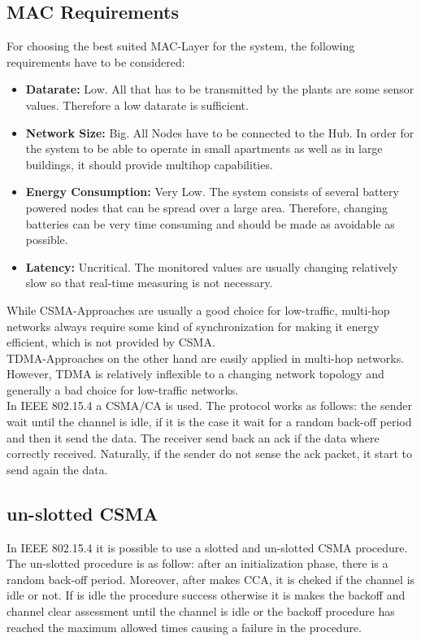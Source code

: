 \subsection{MAC Requirements}
For choosing the best suited MAC-Layer for the system, the following requirements have to be considered:

\begin{itemize}
	\item \textbf{Datarate:}
	Low. All that has to be transmitted by the plants are some sensor values. Therefore a low datarate is sufficient.
	\item \textbf{Network Size:}
	Big. All Nodes have to be connected to the Hub. In order for the system to be able to operate in small apartments as well as in large buildings, it should provide multihop capabilities.
	\item \textbf{Energy Consumption:}
	Very Low. The system consists of several battery powered nodes that can be spread over a large area. Therefore, changing batteries can be very time consuming and should be made as avoidable as possible.
	\item \textbf{Latency:}
	Uncritical. The monitored values are usually changing relatively slow so that real-time measuring is not necessary.
\end{itemize}

While CSMA-Approaches are usually a good choice for low-traffic, multi-hop networks always require some kind of synchronization for making it energy efficient, which is not provided by CSMA.\\
TDMA-Approaches on the other hand are easily applied in multi-hop networks. However, TDMA is relatively inflexible to a changing network topology and generally a bad choice for low-traffic networks.\\
In IEEE 802.15.4 a CSMA/CA is used. The protocol works as follows:
the sender wait until the channel is idle, if it is the case it wait for a random back-off period and then it send the data. The receiver send back an ack if the data where correctly received. Naturally, if the sender do not sense the ack packet, it start to send again the data.\cite{slide}\\

\subsection{un-slotted CSMA}
In IEEE 802.15.4 it is possible to use a slotted and un-slotted CSMA procedure. The un-slotted procedure is as follow: after an initialization phase, there is a random back-off period. Moreover, after makes CCA, it is cheked if the channel is idle or not. If is idle the procedure success otherwise it is makes the backoff and channel clear assessment until the channel is idle or the backoff procedure has reached the maximum allowed times causing a failure in the procedure.\cite{slide}\\


